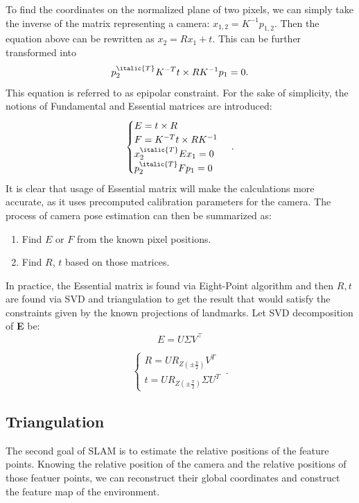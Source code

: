 To find the coordinates on the normalized plane of two pixels, we can simply take the inverse of the matrix representing a camera:
$x_{1, 2} = K^{-1}p_{1, 2}.$ Then the equation above can be rewritten as $x_{2} = Rx_{1} + t.$ This can be further transformed into $$p_{2}^{\italic{T}} K^{-T} t \times R K^{-1} p_{1} = 0.$$ This equation is referred to as epipolar constraint. For the sake of simplicity, the notions of Fundamental and Essential matrices are introduced:
\begin{equation}
    \begin{cases}
      E = t \times R\\
      F = K^{-T} t \times R K^{-1}\\
      x_{2}^{\italic{T}} E x_{1} = 0\\
      p_{2}^{\italic{T}} F p_{1} = 0
    \end{cases}\,.
\end{equation}
It is clear that usage of Essential matrix will make the calculations more accurate, as it uses precomputed calibration parameters for the camera. 
The process of camera pose estimation can then be summarized as:
\begin{enumerate}
    \item Find $E$ or $F$ from the known pixel positions.
    \item Find $R$, $t$ based on those matrices.
\end{enumerate}

In practice, the Essential matrix is found via Eight-Point algorithm and then $R, t$ are found via SVD and triangulation to get the result that would satisfy the constraints given by the known projections of landmarks.
Let SVD decomposition of \textbf{E} be:
$$
E = U \Sigma V^\top
$$

\begin{equation}
    \begin{cases}
        R = U R_{Z(\pm  \frac{\pi}{2})} V^{T}\\
        t = U R_{Z(\pm  \frac{\pi}{2})} \Sigma U^{T}
    \end{cases}\,.
\end{equation}


\subsection{Triangulation}

The second goal of SLAM is to estimate the relative positions of the feature points. Knowing the relative position of the camera and the relative positions of those featuer points, we can reconstruct their global coordinates and construct the feature map of the environment. 

